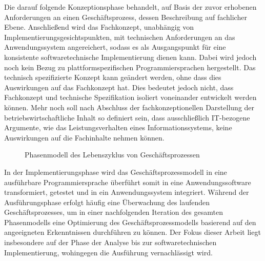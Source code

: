 Die darauf folgende Konzeptionsphase behandelt, auf Basis der zuvor erhobenen Anforderungen an einen Geschäftsprozess, dessen Beschreibung auf fachlicher Ebene. 
\cite{Schwegmann.2002}
Anschließend wird das Fachkonzept, unabhängig von Implementierungsgesichtspunkten, mit technischen Anforderungen an das Anwendungssystem angereichert, sodass es als Ausgangspunkt für eine konsistente softwaretechnische Implementierung dienen kann.
\cite{Scheer.1991}
Dabei wird jedoch noch kein Bezug zu plattformspezifischen Programmiersprachen hergestellt. 
Das technisch spezifizierte Konzept kann geändert werden, ohne dass dies Auswirkungen auf das Fachkonzept hat.
\cite{Speck.2002}
Dies bedeutet jedoch nicht, dass Fachkonzept und technische Spezifikation isoliert voneinander entwickelt werden können. 
Mehr noch soll nach Abschluss der fachkonzeptionellen Darstellung der betriebswirtschaftliche Inhalt so definiert sein, dass ausschließlich \ac{IT}-bezogene Argumente, wie das Leistungsverhalten eines Informationssystems, keine Auswirkungen auf die Fachinhalte nehmen können.  

\begin{figure}[H]
	\centering 
    \caption[Phasenmodell bei der Automatisierung von Geschäftsprozessen]
    {Phasenmodell des Lebenszyklus von Geschäftsprozessen \protect\footnotemark}
    \label{fig:Phasenmodell bei der Automatisierung von Geschäftsprozessen}
\end{figure}

In der Implementierungsphase wird das Geschäftsprozessmodell in eine ausführbare Programmiersprache überführt somit in eine Anwendungssoftware transformiert, getestet und in ein Anwendungssystem integriert.
\cite{Scheer.1991}
Während der Ausführungsphase erfolgt häufig eine Überwachung des laufenden Geschäftsprozesses, um in einer nachfolgenden Iteration des gesamten Phasenmodells eine Optimierung des Geschäftsprozessmodells basierend auf den angeeigneten Erkenntnissen durchführen zu können.
\cite{Scheer.2005}
Der Fokus dieser Arbeit liegt insbesondere auf der Phase der Analyse bis zur softwaretechnischen Implementierung, wohingegen die Ausführung vernachlässigt wird.

